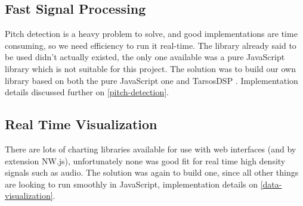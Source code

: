 \subsection{Fast Signal Processing}
Pitch detection is a heavy problem to solve, and good implementations are time
consuming, so we need efficiency to run it real-time. The library already said
to be used didn't actually existed, the only one available was a pure JavaScript
library \cite{pitchfinder} which is not suitable for this project. The solution
was to build our own library based on both the pure JavaScript one and TarsosDSP
\cite{TarsosDSP}. Implementation details discussed further on \autoref{pitch-detection}.

\subsection{Real Time Visualization}
There are lots of charting libraries available for use with web interfaces (and
by extension NW.js), unfortunately none was good fit for real time high density
signals such as audio. The solution was again to build one, since all other things
are looking to run smoothly in JavaScript, implementation details on \autoref{data-visualization}.
